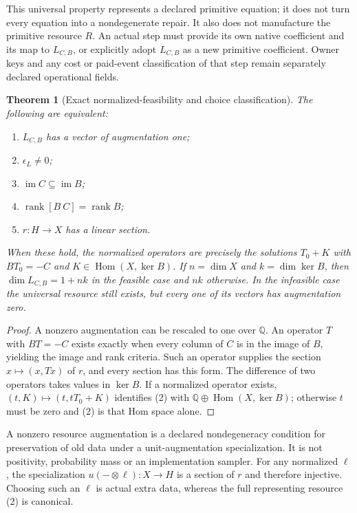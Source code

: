 \documentclass[11pt]{article}
\newtheorem{theorem}{Theorem}\newtheorem{proposition}{Proposition}\newtheorem{lemma}{Lemma}
\newcommand{\Hom}{\operatorname{Hom}}\newcommand{\im}{\operatorname{im}}
\begin{document}
This universal property represents a declared primitive equation; it does not turn every equation into a nondegenerate repair. It also does not manufacture the primitive resource $R$. An actual step must provide its own native coefficient and its map to $L_{C,B}$, or explicitly adopt $L_{C,B}$ as a new primitive coefficient. Owner keys and any cost or paid-event classification of that step remain separately declared operational fields.

\begin{theorem}[Exact normalized-feasibility and choice classification]
The following are equivalent:
\begin{enumerate}
\item $L_{C,B}$ has a vector of augmentation one;
\item $\epsilon_L\ne0$;
\item $\im C\subseteq\im B$;
\item $\operatorname{rank}[B\ C]=\operatorname{rank}B$;
\item $r:H\to X$ has a linear section.
\end{enumerate}
When these hold, the normalized operators are precisely the solutions $T_0+K$ with $BT_0=-C$ and $K\in\Hom(X,\ker B)$. If $n=\dim X$ and $k=\dim\ker B$, then $\dim L_{C,B}=1+nk$ in the feasible case and $nk$ otherwise. In the infeasible case the universal resource still exists, but every one of its vectors has augmentation zero.
\end{theorem}
\begin{proof}
A nonzero augmentation can be rescaled to one over $\mathbb Q$. An operator $T$ with $BT=-C$ exists exactly when every column of $C$ is in the image of $B$, yielding the image and rank criteria. Such an operator supplies the section $x\mapsto(x,Tx)$ of $r$, and every section has this form. The difference of two operators takes values in $\ker B$. If a normalized operator exists, $(t,K)\mapsto(t,tT_0+K)$ identifies (2) with $\mathbb Q\oplus\Hom(X,\ker B)$; otherwise $t$ must be zero and (2) is that Hom space alone.
\end{proof}

A nonzero resource augmentation is a declared nondegeneracy condition for preservation of old data under a unit-augmentation specialization. It is not positivity, probability mass or an implementation sampler. For any normalized $\ell$, the specialization $u(-\otimes\ell):X\to H$ is a section of $r$ and therefore injective. Choosing such an $\ell$ is actual extra data, whereas the full representing resource (2) is canonical.
\end{document}
